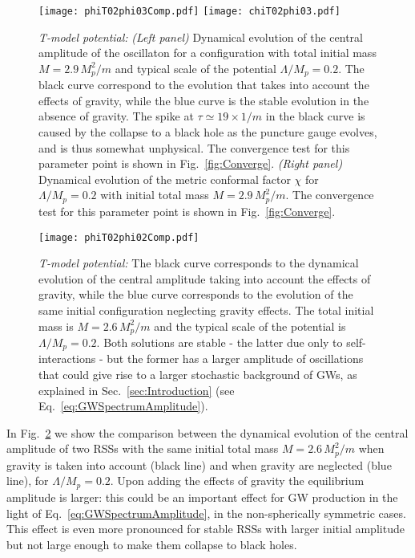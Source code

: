\documentclass[11pt,a4paper]{article}
\begin{document}
\begin{figure}[h!]
\centering
	\texttt{[image: phiT02phi03Comp.pdf]}
    \texttt{[image: chiT02phi03.pdf]}
    \caption{
    {\it T-model potential: } \textit{(Left panel)} 
   Dynamical evolution of the central amplitude of the oscillaton for a configuration with total initial mass $M = 2.9 \, M_p^2/m$ and typical scale of the potential $\Lambda/M_p = 0.2$. The black curve correspond to the evolution that takes into account the effects of gravity, while the blue curve is the stable evolution in the absence of gravity.
 The spike at $\tau \simeq 19 \times 1/m$ in the black curve is caused by the collapse to a black hole as the puncture gauge evolves, and is thus somewhat unphysical. The convergence test for this parameter point is shown in Fig.~\ref{fig:Converge}. 
 \textit{(Right panel)} Dynamical evolution of the metric conformal factor $\chi$ for $\Lambda/M_p = 0.2$ with initial total mass $M = 2.9 \, M_p^2/m$. The convergence test for this parameter point is shown in Fig.~\ref{fig:Converge}.}
\label{fig:phiT02phi03Comp}
\end{figure}

\begin{figure}[h!]
    \centering
    \texttt{[image: phiT02phi02Comp.pdf]}
    \caption{{\it T-model potential: }The black curve corresponds to the dynamical evolution of the central amplitude taking into account the effects of gravity, while the blue curve corresponds to the evolution of the same initial configuration neglecting gravity effects. The total initial mass is $M = 2.6 \, M_p^2/m$ and the typical scale of the potential is $\Lambda/M_p = 0.2$. Both solutions are stable - the latter due only to self-interactions - but the former has a larger amplitude of oscillations that could give rise to a larger stochastic background of GWs, as explained in Sec.~\ref{sec:Introduction} (see Eq.~\eqref{eq:GWSpectrumAmplitude}).}
\label{fig:phiT02phi02Comp}
\end{figure}

In Fig.~\ref{fig:phiT02phi02Comp} we show the comparison between the dynamical evolution of the central amplitude of two RSSs with the same initial total mass $M = 2.6 \, M_p^2/m$ when gravity is taken into account (black line) and when gravity are neglected (blue line), for $\Lambda/M_p = 0.2$. Upon adding the effects of gravity the equilibrium amplitude is larger: this could be an important effect for GW production in the light of Eq.~\eqref{eq:GWSpectrumAmplitude}, in the non-spherically symmetric cases. This effect is even more pronounced for stable RSSs with larger initial amplitude but not large enough to make them collapse to black holes.
\end{document}
